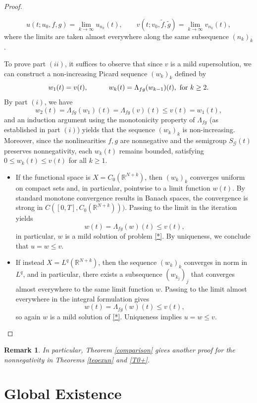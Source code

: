 \documentclass[a4,psfig,english,12pt,epsf,portrait]{article}
\newtheorem{remark}{Remark}[section]
\numberwithin{equation}{section}
\begin{document}
\begin{proof}
\begin{itemize}
		$$u(t;u_0,f,g) = \lim\limits_{k\rightarrow\infty} u_{n_k}(t),\qquad  v(t;v_0,\tilde{f},\tilde{g}) = \lim\limits_{k\rightarrow\infty} v_{n_k}(t),$$ 
		where the limits are taken almost everywhere along the same subsequence $(n_k)_k$.\\
	\end{itemize}
	To prove part $(ii)$, it suffices to observe that since $v$ is a mild supersolution, we can construct a non-increasing Picard sequence $(w_k)_k$ defined by
	$$
	w_{1}(t) =v(t),\qquad\quad w_{k}(t) =\Lambda_{fg} (w_{k-1})(t),\,\,\hbox{for}\,\, k\geq2.
	$$
	By part $(i)$, we have
	$$w_{2}(t) =\Lambda_{fg} (w_1)(t)=\Lambda_{fg} (v)(t)\leq v(t)=w_1(t),$$ 
	and an induction argument using the monotonicity property of $\Lambda_{fg}$ (as established in part $(i)$) yields that the sequence $(w_k)_k$  is non-increasing. Moreover, since the nonlinearities $f,g$ are nonnegative and the semigroup $S_\mathcal{G}(t)$ preserves nonnegativity, each $w_k(t)$ remains bounded, satisfying $0\leq w_k(t)\leq v(t)$ for all $k\geq1$.
	\begin{itemize}
		\item  If the functional space is $X=C_0(\mathbb{R}^{N+k})$, then $(w_k)_k$ converges uniform on compact sets and, in particular,
		pointwise to a limit function $w(t)$. By standard monotone convergence results in Banach spaces, the convergence is strong in $C([0,T],C_0(\mathbb{R}^{N+k})))$. Passing to the limit in the iteration yields
		$$w(t)= \Lambda_{fg} (w)(t)\leq v(t),$$
		in particular, $w$ is a mild solution of problem \eqref{*}. By uniqueness, we conclude that $u=w\leq v$.
		\item  If instead $X=L^q(\mathbb{R}^{N+k})$,  then the sequence $(w_k)_k$ converges in norm in $L^q$, and in particular, there exists a subsequence $(w_{k_j})_j$ that converges almost everywhere to the same limit function $w$. Passing to the limit almost everywhere in the integral formulation gives
		$$w(t)= \Lambda_{fg} (w)(t)\leq v(t),$$
		so again $w$ is a mild solution of \eqref{*}. Uniqueness implies $u=w\leq v$.
	\end{itemize} 
\end{proof}


\begin{remark}
	In particular, Theorem \ref{comparison} gives another proof for the nonnegativity in Theorems \ref{teoexun} and \ref{T0+}.
\end{remark}

\section{Global Existence}\label{global}
\end{document}
